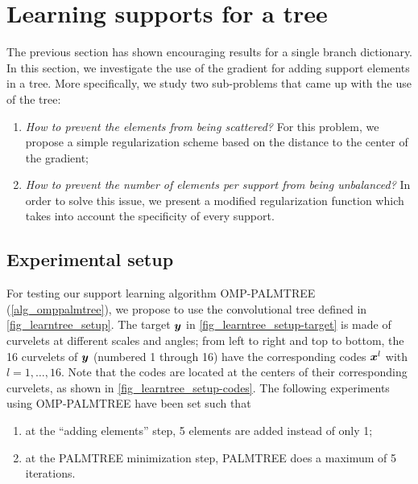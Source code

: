 
\FloatBarrier
\section{Learning supports for a tree}

The previous section has shown encouraging results for a single branch dictionary. In this section, we investigate the use of the gradient for adding support elements in a tree. More specifically, we study two sub-problems that came up with the use of the tree:
\begin{enumerate}[label=--,noitemsep,nolistsep]
	\item \emph{How to prevent the elements from being scattered?} For this problem, we propose a simple regularization scheme based on the distance to the center of the gradient;
	\item \emph{How to prevent the number of elements per support from being unbalanced?} In order to solve this issue, we present a modified regularization function which takes into account the specificity of every support.
\end{enumerate}


\subsection{Experimental setup}

For testing our support learning algorithm OMP-PALMTREE (\cref{alg_omppalmtree}), we propose to use the convolutional tree defined in \cref{fig_learntree_setup}. The target $\bm{y}$ in \cref{fig_learntree_setup-target} is made of curvelets at different scales and angles; from left to right and top to bottom, the 16 curvelets of $\bm{y}$ (numbered 1 through 16) have the corresponding codes $\bm{x}^l$ with $l=1,\dots,16$. Note that the codes are located at the centers of their corresponding curvelets, as shown in \cref{fig_learntree_setup-codes}.
The following experiments using OMP-PALMTREE have been set such that
\begin{enumerate}[label=(\roman*),noitemsep,nolistsep]
\item at the “adding elements” step, 5 elements are added instead of only 1;
\item at the PALMTREE minimization step, PALMTREE does a maximum of 5 iterations.
\end{enumerate}

